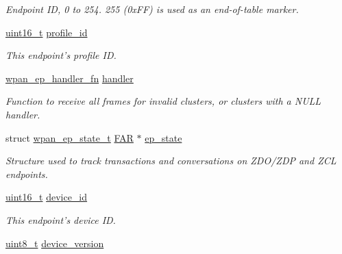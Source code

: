 \begin{DoxyCompactItemize}
\begin{DoxyCompactList}\small\item\em Endpoint I\-D, 0 to 254. 255 (0x\-F\-F) is used as an end-\/of-\/table marker. \end{DoxyCompactList}\item 
\hyperlink{group__hal_ga5a8b2dc9e45a9ee81a94ef304fb62505}{uint16\-\_\-t} \hyperlink{group__wpan__aps_ga5ca7f19e5697de2baf0e2147a41a5792}{profile\-\_\-id}
\begin{DoxyCompactList}\small\item\em This endpoint's profile I\-D. \end{DoxyCompactList}\item 
\hyperlink{group__wpan__aps_ga8e6fcd1bdbf3808368a330b9fea021e4}{wpan\-\_\-ep\-\_\-handler\-\_\-fn} \hyperlink{group__wpan__aps_ga4835da0b636ce07eedbf92aa2779a761}{handler}
\begin{DoxyCompactList}\small\item\em Function to receive all frames for invalid clusters, or clusters with a {\ttfamily N\-U\-L\-L} handler. \end{DoxyCompactList}\item 
struct \hyperlink{structwpan__ep__state__t}{wpan\-\_\-ep\-\_\-state\-\_\-t} \hyperlink{group__hal_gaef060b3456fdcc093a7210a762d5f2ed}{F\-A\-R} $\ast$ \hyperlink{group__wpan__aps_ga389966cb276b33004b14ee698c270347}{ep\-\_\-state}
\begin{DoxyCompactList}\small\item\em Structure used to track transactions and conversations on Z\-D\-O/\-Z\-D\-P and Z\-C\-L endpoints. \end{DoxyCompactList}\item 
\hypertarget{group__wpan__aps_gadc401e0e7465eda38f9444eeb6169a10}{\hyperlink{group__hal_ga5a8b2dc9e45a9ee81a94ef304fb62505}{uint16\-\_\-t} \hyperlink{group__wpan__aps_gadc401e0e7465eda38f9444eeb6169a10}{device\-\_\-id}}\label{group__wpan__aps_gadc401e0e7465eda38f9444eeb6169a10}

\begin{DoxyCompactList}\small\item\em This endpoint's device I\-D. \end{DoxyCompactList}\item 
\hypertarget{group__wpan__aps_ga0b8f4e315b56b3e3c53dea801ce92104}{\hyperlink{group__hal_gae1affc9ca37cfb624959c866a73f83c2}{uint8\-\_\-t} \hyperlink{group__wpan__aps_ga0b8f4e315b56b3e3c53dea801ce92104}{device\-\_\-version}}\label{group__wpan__aps_ga0b8f4e315b56b3e3c53dea801ce92104}


\end{DoxyCompactItemize}
